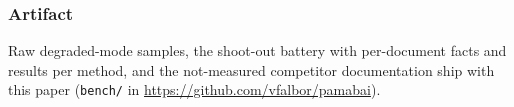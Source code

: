 \documentclass[10pt]{article}
\begin{document}
\subsubsection*{Artifact}
Raw degraded-mode samples, the shoot-out battery with per-document facts and results per method, and the not-measured competitor documentation ship with this paper (\texttt{bench/} in \url{https://github.com/vfalbor/pamabai}).



\end{document}
